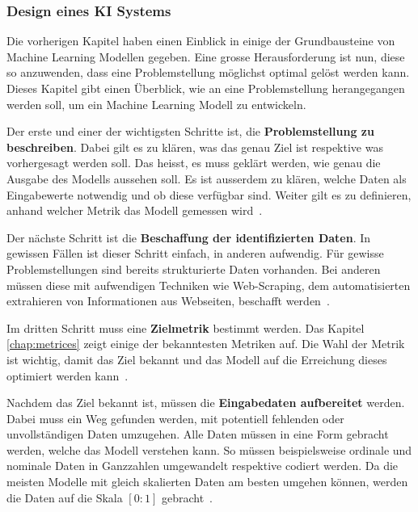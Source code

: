 
\subsubsection{Design eines KI Systems}

Die vorherigen Kapitel haben einen Einblick in einige der Grundbausteine von Machine Learning Modellen gegeben. Eine grosse Herausforderung ist nun, diese so anzuwenden, dass eine Problemstellung möglichst optimal gelöst werden kann. Dieses Kapitel gibt einen Überblick, wie an eine Problemstellung herangegangen werden soll, um ein Machine Learning Modell zu entwickeln.

Der erste und einer der wichtigsten Schritte ist, die \textbf{Problemstellung zu beschreiben}. Dabei gilt es zu klären, was das genau Ziel ist respektive was vorhergesagt werden soll. Das heisst, es muss geklärt werden, wie genau die Ausgabe des Modells aussehen soll. Es ist ausserdem zu klären, welche Daten als Eingabewerte notwendig und ob diese verfügbar sind. Weiter gilt es zu definieren, anhand welcher Metrik das Modell gemessen wird~\autocite{DesignML}.

Der nächste Schritt ist die \textbf{Beschaffung der identifizierten Daten}. In gewissen Fällen ist dieser Schritt einfach, in anderen aufwendig. Für gewisse Problemstellungen sind bereits strukturierte Daten vorhanden. Bei anderen müssen diese mit aufwendigen Techniken wie Web-Scraping, dem automatisierten extrahieren von Informationen aus Webseiten, beschafft werden~\autocite{DesignML}.

Im dritten Schritt muss eine \textbf{Zielmetrik} bestimmt werden. Das Kapitel \ref{chap:metrices} zeigt einige der bekanntesten Metriken auf. Die Wahl der Metrik ist wichtig, damit das Ziel bekannt und das Modell auf die Erreichung dieses optimiert werden kann~\autocite{DesignML}.

Nachdem das Ziel bekannt ist, müssen die \textbf{Eingabedaten aufbereitet} werden. Dabei muss ein Weg gefunden werden, mit potentiell fehlenden oder unvollständigen Daten umzugehen. Alle Daten müssen in eine Form gebracht werden, welche das Modell verstehen kann. So müssen beispielsweise ordinale und nominale Daten in Ganzzahlen umgewandelt respektive codiert werden. Da die meisten Modelle mit gleich skalierten Daten am besten umgehen können, werden die Daten auf die Skala $[0:1]$ gebracht~\autocite{DesignML}.

